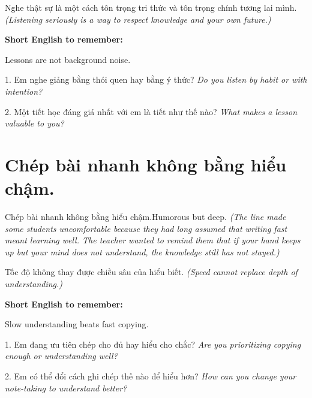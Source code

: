 \begin{baihoc}
Nghe thật sự là một cách tôn trọng tri thức và tôn trọng chính tương lai mình.
\textit{(Listening seriously is a way to respect knowledge and your own future.)}
\end{baihoc}

\begin{ghinhoanh}
\textbf{Short English to remember:}

Lessons are not background noise.

\end{ghinhoanh}

\begin{tuhocnhanh}
1. Em nghe giảng bằng thói quen hay bằng ý thức? \textit{Do you listen by habit or with intention?}

2. Một tiết học đáng giá nhất với em là tiết như thế nào? \textit{What makes a lesson valuable to you?}
\end{tuhocnhanh}
\ngancach

\section{Chép bài nhanh không bằng hiểu chậm.}
\begin{truyen}{Chép bài nhanh không bằng hiểu chậm.}{Humorous but deep.}
\textit{(The line made some students uncomfortable because they had long assumed that writing fast meant learning well. The teacher wanted to remind them that if your hand keeps up but your mind does not understand, the knowledge still has not stayed.)}
\end{truyen}

\begin{baihoc}
Tốc độ không thay được chiều sâu của hiểu biết.
\textit{(Speed cannot replace depth of understanding.)}
\end{baihoc}

\begin{ghinhoanh}
\textbf{Short English to remember:}

Slow understanding beats fast copying.

\end{ghinhoanh}

\begin{tuhocnhanh}
1. Em đang ưu tiên chép cho đủ hay hiểu cho chắc? \textit{Are you prioritizing copying enough or understanding well?}

2. Em có thể đổi cách ghi chép thế nào để hiểu hơn? \textit{How can you change your note-taking to understand better?}
\end{tuhocnhanh}
\ngancach


